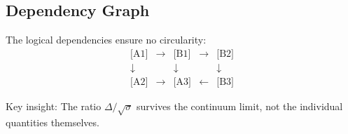 \subsection{Dependency Graph}

The logical dependencies ensure no circularity:
\[
\boxed{
\begin{array}{ccccc}
\text{[A1]} & \longrightarrow & \text{[B1]} & \longrightarrow & \text{[B2]} \\
\downarrow &  & \downarrow &  & \downarrow \\
\text{[A2]} & \longrightarrow & \text{[A3]} & \longleftarrow & \text{[B3]}
\end{array}
}
\]

Key insight: The ratio $\Delta/\sqrt{\sigma}$ survives the continuum limit, 
not the individual quantities themselves.






